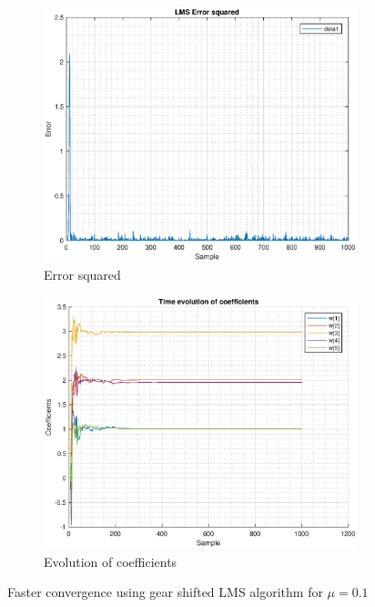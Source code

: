 \documentclass{article}
\begin{document}
\begin{figure}[h!]
\centering
\begin{subfigure}{0.33\textwidth}
\centering
\includegraphics[width = \textwidth]{lms_gs_error}
\caption{Error squared}
\label{fig:lms_gs_error}
\end{subfigure}
\begin{subfigure}{0.33\textwidth}
\centering
\includegraphics[width = \textwidth]{lms_gs_timeevol}
\caption{Evolution of coefficients}
\label{fig:lms_gs_timeevol}
\end{subfigure}
\caption{\label{fig:lms_gs} Faster convergence using gear shifted LMS algorithm for $\mu=0.1$}
\end{figure}
\end{document}
